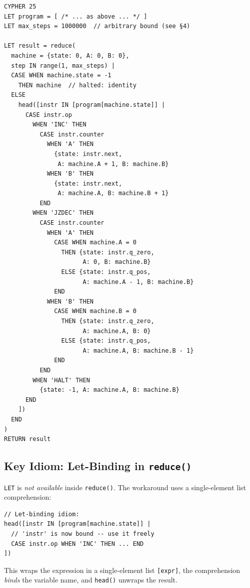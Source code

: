 \documentclass[11pt,a4paper]{article}
\begin{document}
\begin{codeblock}
\begin{lstlisting}
CYPHER 25
LET program = [ /* ... as above ... */ ]
LET max_steps = 1000000  // arbitrary bound (see §4)

LET result = reduce(
  machine = {state: 0, A: 0, B: 0},
  step IN range(1, max_steps) |
  CASE WHEN machine.state = -1
    THEN machine  // halted: identity
  ELSE
    head([instr IN [program[machine.state]] |
      CASE instr.op
        WHEN 'INC' THEN
          CASE instr.counter
            WHEN 'A' THEN
              {state: instr.next,
               A: machine.A + 1, B: machine.B}
            WHEN 'B' THEN
              {state: instr.next,
               A: machine.A, B: machine.B + 1}
          END
        WHEN 'JZDEC' THEN
          CASE instr.counter
            WHEN 'A' THEN
              CASE WHEN machine.A = 0
                THEN {state: instr.q_zero,
                      A: 0, B: machine.B}
                ELSE {state: instr.q_pos,
                      A: machine.A - 1, B: machine.B}
              END
            WHEN 'B' THEN
              CASE WHEN machine.B = 0
                THEN {state: instr.q_zero,
                      A: machine.A, B: 0}
                ELSE {state: instr.q_pos,
                      A: machine.A, B: machine.B - 1}
              END
          END
        WHEN 'HALT' THEN
          {state: -1, A: machine.A, B: machine.B}
      END
    ])
  END
)
RETURN result
\end{lstlisting}
\end{codeblock}

\subsection{Key Idiom: Let-Binding in \texttt{reduce()}}

\texttt{LET} is \emph{not available} inside \texttt{reduce()}.
The workaround uses a single-element list comprehension:

\begin{codeblock}
\begin{lstlisting}
// Let-binding idiom:
head([instr IN [program[machine.state]] |
  // 'instr' is now bound -- use it freely
  CASE instr.op WHEN 'INC' THEN ... END
])
\end{lstlisting}
\end{codeblock}

This wraps the expression in a single-element list \texttt{[expr]},
the comprehension \emph{binds} the variable name, and \texttt{head()}
unwraps the result.
\end{document}
